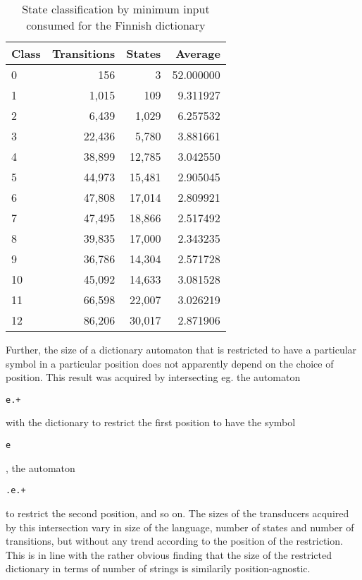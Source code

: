 \documentclass[11pt]{article}
\begin{document}
\begin{table}[h]
\begin{center}
\begin{scriptsize}
\begin{tabular}{|l|rrr|}
\hline
\bf Class & \bf Transitions & \bf States & \bf Average \\ 
\hline
0 & 156 & 3 & 52.000000 \\
1 & 1,015 & 109 & 9.311927 \\
2 & 6,439 & 1,029 & 6.257532 \\
3 & 22,436 & 5,780 & 3.881661 \\
4 & 38,899 & 12,785 & 3.042550 \\
5 & 44,973 & 15,481 & 2.905045 \\
6 & 47,808 & 17,014 & 2.809921 \\
7 & 47,495 & 18,866 & 2.517492 \\
8 & 39,835 & 17,000 & 2.343235 \\
9 & 36,786 & 14,304 & 2.571728 \\
10 & 45,092 & 14,633 & 3.081528 \\
11 & 66,598 & 22,007 & 3.026219 \\
12 & 86,206 & 30,017 & 2.871906 \\
\hline
\end{tabular}
\end{scriptsize}
\end{center}
\caption{\label{table:fi-state-classification}
State classification by minimum input consumed for the Finnish dictionary}
\end{table}

Further, the size of a dictionary automaton that is restricted to have
a particular symbol in a particular position does not apparently depend on the
choice of position. This result was acquired by intersecting eg. the automaton
\begin{verbatim}e.+\end{verbatim} with the dictionary to restrict the first
position to have the symbol
\begin{verbatim}e\end{verbatim}, the automaton
\begin{verbatim}.e.+\end{verbatim} to restrict the second position, and so on.
The sizes of the transducers acquired by this intersection vary in size of the
language, number of states and number of transitions, but without any trend
according to the position of the restriction.
This is in line with the rather obvious finding that the
size of the restricted dictionary in terms of number of strings is similarily
position-agnostic.
\end{document}
